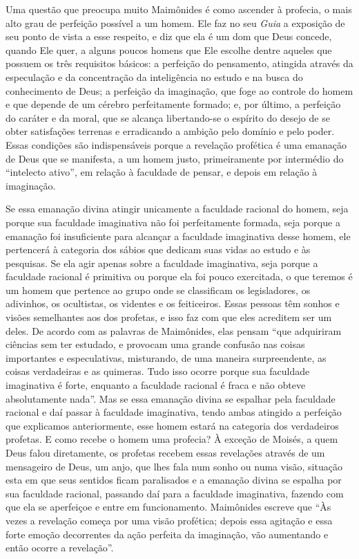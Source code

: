 Uma questão que preocupa muito Maimônides é como ascender à profecia, o
mais alto grau de perfeição possível a um homem. Ele faz no seu
\emph{Guia} a exposição de seu ponto de vista a esse respeito, e diz que
ela é um dom que Deus concede, quando Ele quer, a alguns poucos homens
que Ele escolhe dentre aqueles que possuem os três requisitos básicos: a
perfeição do pensamento, atingida através da especulação e da
concentração da inteligência no estudo e na busca do conhecimento de
Deus; a perfeição da imaginação, que foge ao controle do homem e que
depende de um cérebro perfeitamente formado; e, por último, a perfeição
do caráter e da moral, que se alcança libertando-se o espírito do desejo
de se obter satisfações terrenas e erradicando a ambição pelo domínio e
pelo poder. Essas condições são indispensáveis porque a revelação
profética é uma emanação de Deus que se manifesta, a um homem justo,
primeiramente por intermédio do ``intelecto ativo'', em relação à
faculdade de pensar, e depois em relação à imaginação.

Se essa emanação divina atingir unicamente a faculdade racional do
homem, seja porque sua faculdade imaginativa não foi perfeitamente
formada, seja porque a emanação foi insuficiente para alcançar a
faculdade imaginativa desse homem, ele pertencerá à categoria dos sábios
que dedicam suas vidas ao estudo e às pesquisas. Se ela agir apenas
sobre a faculdade imaginativa, seja porque a faculdade racional é
primitiva ou porque ela foi pouco exercitada, o que teremos é um homem
que pertence ao grupo onde se classificam os legisladores, os
adivinhos, os ocultistas, os videntes e os feiticeiros. Essas pessoas
têm sonhos e visões semelhantes aos dos profetas, e isso faz com que
eles acreditem ser um deles. De acordo com as palavras de Maimônides,
elas pensam ``que adquiriram ciências sem ter estudado, e provocam uma
grande confusão nas coisas importantes e especulativas, misturando, de
uma maneira surpreendente, as coisas verdadeiras e as quimeras. Tudo
isso ocorre porque sua faculdade imaginativa é forte, enquanto a
faculdade racional é fraca e não obteve absolutamente nada''. Mas se
essa emanação divina se espalhar pela faculdade racional e daí passar à
faculdade imaginativa, tendo ambas atingido a perfeição que explicamos
anteriormente, esse homem estará na categoria dos verdadeiros
profetas. E como recebe o homem uma profecia? À exceção de Moisés, a
quem Deus falou diretamente, os profetas recebem essas revelações através de
um mensageiro de Deus, um anjo, que lhes fala num sonho ou numa visão,
situação esta em que seus sentidos ficam paralisados e a emanação
divina se espalha por sua faculdade racional, passando daí para a
faculdade imaginativa, fazendo com que ela se aperfeiçoe e entre em
funcionamento. Maimônides escreve que ``Às vezes a revelação começa por
uma visão profética; depois essa agitação e essa forte emoção
decorrentes da ação perfeita da imaginação, vão aumentando e então
ocorre a revelação''.

